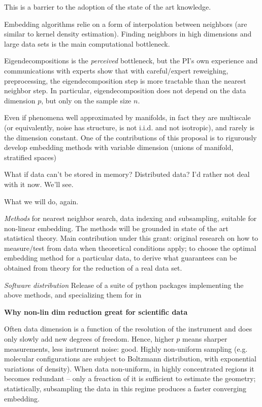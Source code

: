\documentclass[floatfix,11pt]{revtex4}
\begin{document}
This is a barrier to the adoption of the state of the art knowledge. 

\bit
\item Embedding algorithms relie on a form of interpolation between neighbors (are similar to kernel density estimation). Finding neighbors in high dimensions and large data sets is the main computational bottleneck. 
\item Eigendecompositions is the {\em perceived} bottleneck, but the PI's own experience and communications with experts show that with careful/expert reweighing, preprocessing, the eigendecomposition step is more tractable than the nearest neighbor step. In particular, eigendecomposition does not depend on the data dimension $p$, but only on the sample size $n$. 
\item Even if phenomena well approximated by manifolds, in fact they are multiscale (or equivalently, noise has structure, is not i.i.d. and not isotropic), and rarely is the dimension constant. One of the contributions of this proposal is to rigurously develop embedding methods with variable dimension (unions of manifold, stratified spaces)
\item What if data can't be stored in memory? Distributed data? I'd rather not deal with it now. We'll see. 
  \eit

What we will do, again.
\bit
\item  {\em Methods} for nearest neighbor search, data indexing and subsampling, suitable for non-linear embedding. The methods will be grounded in state of the art statistical theory. Main contribution under this grant: original research on how to measure/test from data when theoretical conditions apply; to choose the optimal embedding method for a particular data, to derive what guarantees can be obtained from theory for the reduction of a real data set. 
\item {\em Software distribution} Release of a suite of python packages implementing the above methods, and specializing them for  in  
\eit

  
  {\bf Why non-lin dim reduction great for scientific data}
  \bit
  \item Often data
dimension is a function of the resolution of the instrument and does
only slowly add new degrees of freedom. Hence, higher $p$ means
sharper measurements, less instrument noise: good. Highly non-uniform
sampling (e.g. molecular configurations are subject to Boltzmann
distribution, with exponential variations of density). When data
non-uniform, in highly concentrated regions it becomes redundant --
only a freaction of it is sufficient to estimate the geometry;
statistically, subsampling the data in this regime produces a faster
converging embedding.
\end{document}
